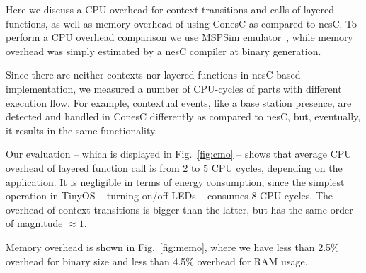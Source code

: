 Here we discuss a CPU overhead for context transitions and calls of layered
functions, as well as memory overhead of using ConesC as compared to nesC. To perform a CPU
overhead comparison we use MSPSim emulator~\cite{eriksson09}, while memory overhead was
simply estimated by a nesC compiler at binary generation.

Since there are neither contexts nor layered functions in nesC-based
implementation, we measured a number of CPU-cycles of parts with different
execution flow. For example, contextual events, like a base station presence,
are detected and handled in ConesC differently as compared to nesC, but,
eventually, it results in the same functionality. 

Our evaluation -- which is displayed in Fig.~\ref{fig:cmo} -- shows that average
CPU overhead of layered function call is from 2 to 5 CPU cycles, depending on the
application. It is negligible in terms of energy consumption, since the simplest
operation in TinyOS -- turning on/off LEDs -- consumes 8 CPU-cycles. The
overhead of context transitions is bigger than the latter, but has the same
order of magnitude $\approx1$.

Memory overhead is shown in Fig.~\ref{fig:memo}, where we have less than 2.5\%
overhead for binary size and less than 4.5\% overhead for RAM usage.

